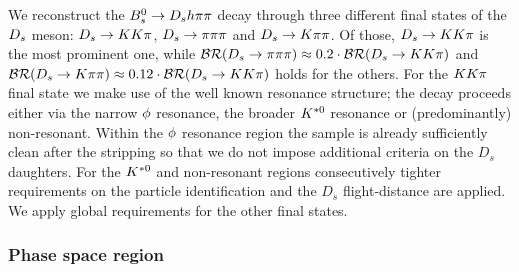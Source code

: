 We reconstruct the ${{B}^0_{s}}\rightarrow{\ensuremath{{D}_{s}}} h{\pi}{\pi}$ decay through three different final states of the ${{D}_{s}}$ meson: ${{D}_{s}}\rightarrow{\ensuremath{K}}{\ensuremath{K}}{\ensuremath{\pi}}$, ${{D}_{s}}\rightarrow{\ensuremath{\pi}}{\ensuremath{\pi}}{\ensuremath{\pi}}$ and ${{D}_{s}}\rightarrow{\ensuremath{K}}{\ensuremath{\pi}}{\ensuremath{\pi}}$.
Of those, ${{D}_{s}}\rightarrow{\ensuremath{K}}{\ensuremath{K}}{\ensuremath{\pi}}$ is the most prominent one,
while $\mathcal{BR}({{D}_{s}}\rightarrow{\ensuremath{\pi}}{\ensuremath{\pi}}{\ensuremath{\pi}}) \approx 0.2\cdot\mathcal{BR}({{D}_{s}}\rightarrow{\ensuremath{K}}{\ensuremath{K}}{\ensuremath{\pi}})$ and $\mathcal{BR}({{D}_{s}}\rightarrow{\ensuremath{K}}{\ensuremath{\pi}}{\ensuremath{\pi}}) \approx 0.12\cdot\mathcal{BR}({{D}_{s}}\rightarrow{\ensuremath{K}}{\ensuremath{K}}{\ensuremath{\pi}})$ holds for the others. 
For the ${K}{K}{\pi}$  final state we make use of the well known resonance structure;
the decay proceeds either via the narrow $\phi$ resonance, the broader ${{K}^{*0}}$ resonance or (predominantly) non-resonant.
Within the $\phi$ resonance region the sample is already sufficiently clean after the stripping so that we do not impose additional criteria on the $D_s$ daughters.
For the ${{K}^{*0}}$ and non-resonant regions consecutively tighter requirements on the particle identification and the $D_s$ flight-distance are applied. 
We apply global requirements for the other final states.


%
%
 
 \subsubsection{Phase space region}
 \label{ssec:phasespace}

